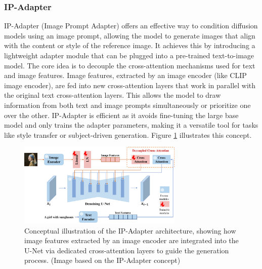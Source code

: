 \subsubsection{IP-Adapter}
IP-Adapter (Image Prompt Adapter) \cite{ipadapter} offers an effective way to condition diffusion models using an image prompt, allowing the model to generate images that align with the content or style of the reference image. It achieves this by introducing a lightweight adapter module that can be plugged into a pre-trained text-to-image model. The core idea is to decouple the cross-attention mechanisms used for text and image features. Image features, extracted by an image encoder (like CLIP \cite{clip} image encoder), are fed into new cross-attention layers that work in parallel with the original text cross-attention layers. This allows the model to draw information from both text and image prompts simultaneously or prioritize one over the other. IP-Adapter is efficient as it avoids fine-tuning the large base model and only trains the adapter parameters, making it a versatile tool for tasks like style transfer or subject-driven generation. Figure \ref{fig:ipadapter-concept} illustrates this concept.

\begin{figure}[h]
  \centering
  \includegraphics[width=0.7\textwidth]{images/related-work/ipadapter.png}
  \caption{Conceptual illustration of the IP-Adapter architecture, showing how image features extracted by an image encoder are integrated into the U-Net via dedicated cross-attention layers to guide the generation process. (Image based on the IP-Adapter concept)}
  \label{fig:ipadapter-concept}
\end{figure}

